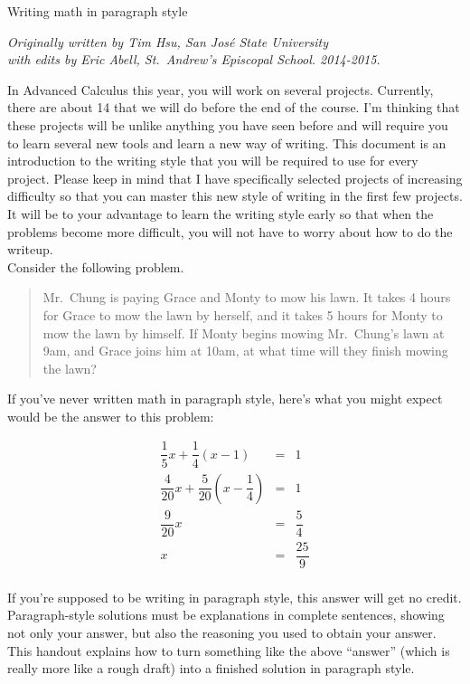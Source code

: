\documentclass{article}
\begin{document}
\begin{center}
\Huge{Writing math in paragraph style}
\end{center}

\begin{center}
\textit{Originally written by Tim Hsu, San Jos\'e State University\\with edits by Eric Abell, St.\ Andrew's Episcopal School. 2014-2015.}
\end{center}

In Advanced Calculus this year, you will work on several projects. Currently, there are about 14 that we will do before the end of the course. I'm thinking that these projects will be unlike anything you have seen before and will require you to learn several new tools and learn a new way of writing. This document is an introduction to the writing style that you will be required to use for every project. Please keep in mind that I have specifically selected projects of increasing difficulty so that you can master this new style of writing in the first few projects. It will be to your advantage to learn the writing style early so that when the problems become more difficult, you will not have to worry about how to do the writeup.
\\

Consider the following problem.

\begin{quote}
Mr.\ Chung is paying Grace and Monty to mow his lawn. It takes 4 hours for Grace to mow the lawn by herself, and it takes 5 hours for Monty to mow the lawn by himself. If Monty begins mowing Mr.\ Chung's lawn at 9am, and Grace joins him at 10am, at what time will they finish mowing the lawn?
\end{quote}

If you've never written math in paragraph style, here's what you might expect would be the answer to this problem:

\begin{eqnarray*}
	\dfrac{1}{5}x + \dfrac{1}{4}(x - 1) &=& 1 \\
	\dfrac{4}{20}x + \dfrac{5}{20}\left(x - \dfrac{1}{4}\right) &=& 1 \\
	\dfrac{9}{20}x &=& \dfrac{5}{4} \\
	x &=& \dfrac{25}{9} \\
\end{eqnarray*}

If you're supposed to be writing in paragraph style, this answer will get no credit. Paragraph-style solutions must be explanations in complete sentences, showing not only your answer, but also the reasoning you used to obtain your answer. This handout explains how to turn something like the above ``answer'' (which is really more like a rough draft) into a finished solution in paragraph style.
\end{document}
